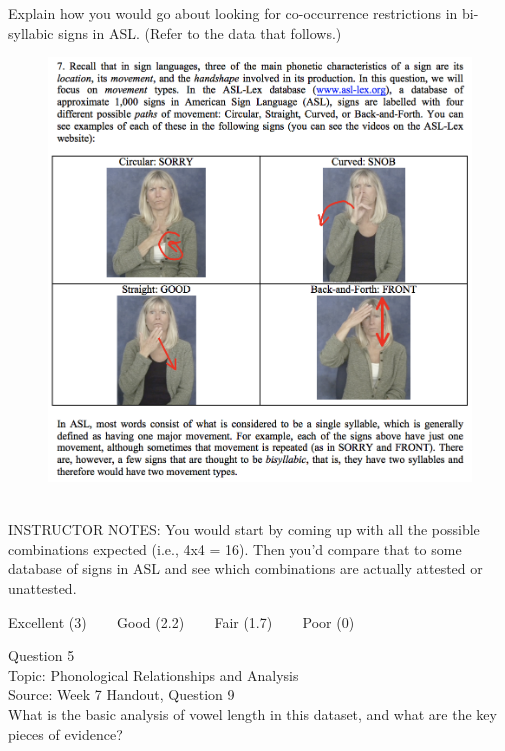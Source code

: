 \documentclass[12pt]{article}
\begin{document}
Explain how you would go about looking for co-occurrence restrictions in bi-syllabic signs in ASL. (Refer to the data that follows.)\\

\begin{figure}[H]
\includegraphics{../images/ASL_movement.png}
\end{figure}

~\\
INSTRUCTOR NOTES: You would start by coming up with all the possible combinations expected (i.e., 4x4 = 16). Then you'd compare that to some database of signs in ASL and see which combinations are actually attested or unattested.


\vfill
Excellent (3) ~~~ Good (2.2) ~~~ Fair (1.7) ~~~ Poor (0)
\newpage

{\large Question 5}\\

Topic: Phonological Relationships and Analysis\\
Source: Week 7 Handout, Question 9\\

What is the basic analysis of vowel length in this dataset, and what are the key pieces of evidence?\\
\end{document}
